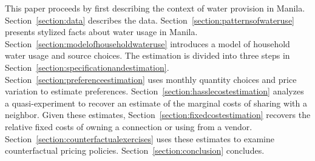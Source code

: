 \documentclass[12pt]{article}
\begin{document}
This paper proceeds by first describing the context of water provision in Manila.  Section~\ref{section:data} describes the data.  Section~\ref{section:patternsofwateruse} presents stylized facts about water usage in Manila.  Section~\ref{section:modelofhouseholdwateruse} introduces a model of household water usage and source choices.  The estimation is divided into three steps in Section~\ref{section:specificationandestimation}.  Section~\ref{section:preferenceestimation} uses monthly quantity choices and price variation to estimate preferences.  Section~\ref{section:hasslecostestimation} analyzes a quasi-experiment to recover an estimate of the marginal costs of sharing with a neighbor.  Given these estimates, Section~\ref{section:fixedcostestimation} recovers the relative fixed costs of owning a connection or using from a vendor.  Section~\ref{section:counterfactualexercises} uses these estimates to examine counterfactual pricing policies.  Section~\ref{section:conclusion} concludes.


\end{document}

